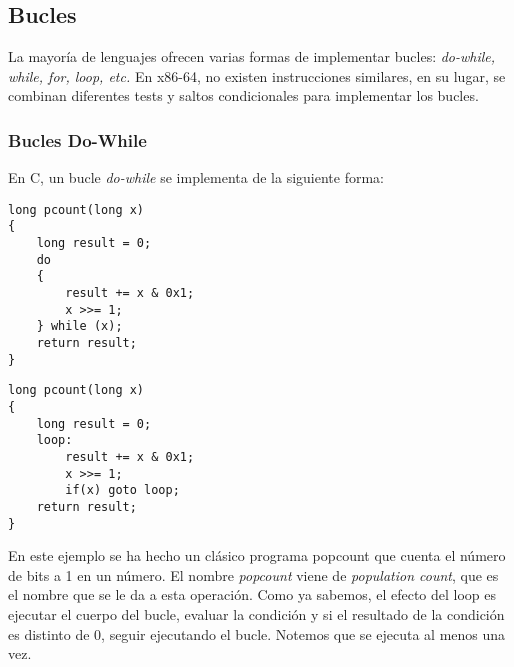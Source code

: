 \subsection{Bucles}
La mayoría de lenguajes ofrecen varias formas de implementar bucles: \textit{ do-while, while, for, loop, etc.} En x86-64, no existen instrucciones
similares, en su lugar, se combinan diferentes tests y saltos condicionales para implementar los bucles.
\subsubsection{Bucles Do-While}
En C, un bucle \textit{do-while} se implementa de la siguiente forma:
\begin{center}
	\begin{minipage}{0.45\textwidth}
		\begin{verbatim}
long pcount(long x)
{
    long result = 0;
    do
    {
        result += x & 0x1;
        x >>= 1;
    } while (x);
    return result;
}
        \end{verbatim}
	\end{minipage}
	\begin{minipage}{0.45\textwidth}
		\begin{verbatim}
long pcount(long x)
{
    long result = 0;
    loop:
        result += x & 0x1;
        x >>= 1;
        if(x) goto loop;
    return result;
}
        \end{verbatim}

	\end{minipage}
\end{center}
En este ejemplo se ha hecho un clásico programa popcount que cuenta el número de bits a 1 en un número.
El nombre \textit{popcount} viene de \textit{population count}, que es el nombre que se le da a esta operación.
Como ya sabemos, el efecto del loop es ejecutar el cuerpo del bucle, evaluar la condición y si el resultado de la condición es distinto de 0,
seguir ejecutando el bucle. Notemos que se ejecuta al menos una vez.
